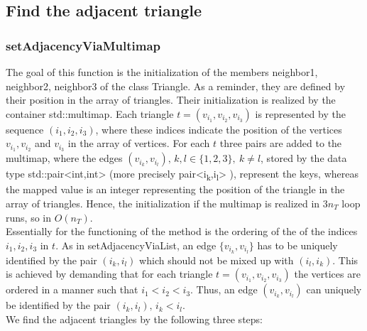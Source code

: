 \documentclass[10pt]{article}
\begin{document}
\subsection{Find the adjacent triangle}

\subsubsection{setAdjacencyViaMultimap} \label{multimap}

The goal of this function is the initialization of the members {\ttfamily neighbor1, neighbor2, neighbor3} of the class {\ttfamily Triangle}. As a reminder, they are defined by their position in the array of triangles. Their initialization is realized by the container {\ttfamily std::multimap}. 
Each triangle $ t = (v_{i_1},v_{i_2},v_{i_3}) $ is represented by the sequence $ (i_1,i_2,i_3) $, where these indices indicate the position of the vertices $v_{i_1},v_{i_2}$ and $v_{i_3}$ in the array of vertices. 
For each $ t $ three pairs are added to the multimap, where the edges $(v_{i_k},v_{i_l}), \, k,l \in \{1,2,3\}, \ k \neq l $, stored by the data type {\ttfamily std::pair<int,int> } (more precisely {\ttfamily  pair<i\textsubscript{k},i\textsubscript{l}> }), represent the keys, whereas the mapped value is an integer representing the position of the triangle in the array of triangles. Hence, the initialization if the multimap is realized in $ 3n_T $ loop runs, so in $ O(n_T) $. \\
Essentially for the functioning of the method is the ordering of the of the indices $ i_1,i_2,i_3 $ in $ t $. As in {\ttfamily setAdjacencyViaList}, an edge $ \{ v_{i_k}, v_{i_l}\} $
 has to be uniquely identified by the pair $ (i_k,i_l) $ which should not be mixed up with $(i_l,i_k) $. This is achieved by demanding that for each triangle $ t =  (v_{i_1},v_{i_2},v_{i_3})$ the vertices are ordered in a manner such that $ i_1 < i_2 < i_3 $. Thus, an edge $(v_{i_k},v_{i_l}) $ can uniquely be identified by the pair $ (i_k,i_l), \, i_k < i_l $. \\
 We find the adjacent triangles by the following three steps: 
\end{document}
